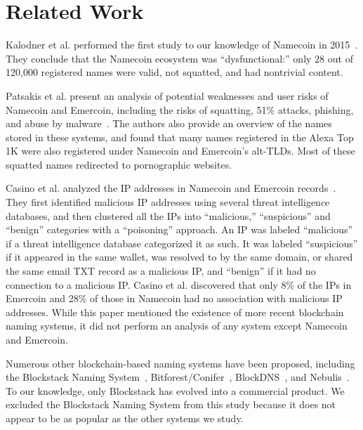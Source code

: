 \section{Related Work}

Kalodner et al. performed the first study to our knowledge of 
Namecoin in 2015~\cite{kalodner_namecoin_2015}. They conclude 
that the Namecoin ecosystem was ``dysfunctional:'' only 28 
out of 120,000 registered names were valid, not squatted, and 
had nontrivial content.

Patsakis et al. present an analysis of potential weaknesses 
and user risks of 
Namecoin and Emercoin, including the risks of squatting, 51\% 
attacks, phishing, and abuse by 
malware~\cite{patsakis_unravelling_2020}. The authors also 
provide an overview of the names stored in these systems, and 
found that many names registered in the Alexa Top 1K were 
also registered under Namecoin and Emercoin's alt-TLDs. Most 
of these squatted names redirected to pornographic websites.

Casino et al. analyzed the IP addresses in Namecoin and 
Emercoin records~\cite{casino_unearthing_2021}. They first 
identified malicious IP addresses using several threat 
intelligence databases, and then clustered all the IPs into 
``malicious,'' ``suspicious'' and ``benign'' categories with 
a ``poisoning'' 
approach. An IP was labeled ``malicious'' if a threat 
intelligence database categorized it as such. It was labeled 
``suspicious'' if it appeared in the same wallet, was 
resolved to by the same domain, or shared the same email TXT 
record as a malicious IP, and ``benign'' if it had no 
connection to a malicious IP. Casino et al. discovered that 
only 8\% of the IPs in Emercoin and 28\% of those in Namecoin 
had no association with malicious IP addresses. While this 
paper mentioned the existence of more recent blockchain 
naming systems, it did not perform an analysis of any system 
except Namecoin and Emercoin.


Numerous other blockchain-based naming systems have been 
proposed, including
the Blockstack Naming System~\cite{ali2016blockstack}, 
Bitforest/Conifer~\cite{dong2018bitforest, dong2018conifer}, 
BlockDNS~\cite{blockdns}, and 
Nebulis~\cite{nebulis_2016}. To our knowledge, 
only Blockstack has evolved into a commercial product. We 
excluded the Blockstack Naming System from this study because 
it does not appear to be as popular as the other systems we 
study.

